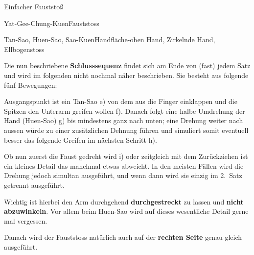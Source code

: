 \begin{WTSatz}{Einfacher Fauststo{\ss}}
\begin{WTSatzTeil}{Yat-Gee-Chung-Kuen}{Fauststoss}
		
	\end{WTSatzTeil}
	\begin{WTSatzTeil}{Tan-Sao, Huen-Sao, Sao-Kuen}{Handfl\"ache-oben Hand, Zirkelnde Hand, Ellbogenstoss}
	
		Die nun beschriebene \textbf{Schlusssequenz} findet sich am Ende von (fast) jedem Satz und wird im folgenden nicht nochmal n\"aher beschrieben. Sie besteht aus folgende f\"unf Bewegungen:
		
		
		Ausgangspunkt ist ein Tan-Sao e) von dem aus die Finger einklappen und die Spitzen den Unterarm greifen wollen f). Danach folgt eine halbe Umdrehung der Hand (Huen-Sao) g) bis mindestens ganz nach unten; eine Drehung weiter nach aussen w\"urde zu einer zus\"atzlichen Dehnung f\"uhren und simuliert somit eventuell besser das folgende Greifen im n\"achsten Schritt h).
		
		
		Ob nun zuerst die Faust gedreht wird i) oder zeitgleich mit dem Zur\"uckziehen ist ein kleines Detail das manchmal etwas abweicht. In den meisten F\"allen wird die Drehung jedoch simultan ausgef\"uhrt, und wenn dann wird sie einzig im 2.~Satz getrennt ausgef\"uhrt.
		
	\begin{WTCommonNoob}
		Wichtig ist hierbei den Arm durchgehend \textbf{durchgestreckt} zu lassen und \textbf{nicht abzuwinkeln}. Vor allem beim Huen-Sao wird auf dieses wesentliche Detail gerne mal vergessen.
	\end{WTCommonNoob}
	
	Danach wird der Fauststoss nat\"urlich auch auf der \textbf{rechten Seite} genau gleich ausgef\"uhrt.
		
	\end{WTSatzTeil}
\end{WTSatz}


